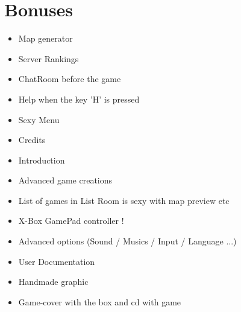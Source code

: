 \documentclass{koala-fr}
\begin{document}
\newpage

\section{Bonuses}

\begin{itemize}
  \item Map generator
  \item Server Rankings
  \item ChatRoom before the game
  \item Help when the key 'H' is pressed
  \item Sexy Menu
  \item Credits
  \item Introduction
  \item Advanced game creations
  \item List of games in List Room is sexy with map preview etc
  \item X-Box GamePad controller !
  \item Advanced options (Sound / Musics / Input / Language ...)
  \item User Documentation
  \item Handmade graphic
  \item Game-cover with the box and cd with game
\end{itemize}
\end{document}
